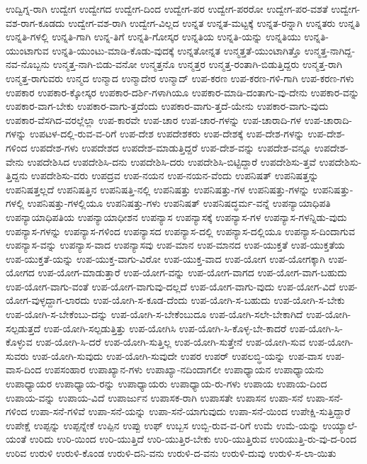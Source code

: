 {ಉದ್ವಿಗ್ನ-ರಾಗಿ
ಉದ್ವೇಗ
ಉದ್ವೇಗದ
ಉದ್ವೇಗ-ದಿಂದ
ಉದ್ವೇಗ-ಪರ
ಉದ್ವೇಗ-ಪರರೋ
ಉದ್ವೇಗ-ಪರ-ವಶತೆ
ಉದ್ವೇಗ-ವಶ-ರಾಗ-ಕೂಡದು
ಉದ್ವೇಗ-ವಶ-ರಾಗಿ
ಉದ್ವೇಗ-ವಿಲ್ಲದ
ಉನ್ನತ
ಉನ್ನತ-ಮಟ್ಟಕ್ಕೆ
ಉನ್ನತ-ರನ್ನಾಗಿ
ಉನ್ನತರು
ಉನ್ನತಿ
ಉನ್ನತಿ-ಗಳಲ್ಲಿ
ಉನ್ನತಿ-ಗಾಗಿ
ಉನ್ನ-ತಿಗೆ
ಉನ್ನತಿ-ಗೋಸ್ಕರ
ಉನ್ನತಿಯ
ಉನ್ನತಿ-ಯನ್ನು
ಉನ್ನತಿಯು
ಉನ್ನತಿ-ಯುಂಟಾಗುವ
ಉನ್ನತಿ-ಯುಂಟು-ಮಾಡಿ-ಕೊಡು-ವುದಕ್ಕೆ
ಉನ್ನತೋನ್ನತ
ಉನ್ಮತ್ತತೆ-ಯುಂಟಾಗಿತ್ತೊ
ಉನ್ಮತ್ತ-ನಾಗಿದ್ದ-ನವ-ನೊಬ್ಬನು
ಉನ್ಮತ್ತ-ನಾಗಿ-ಬಿಡು-ವನೋ
ಉನ್ಮತ್ತನೊ
ಉನ್ಮತ್ತರ
ಉನ್ಮತ್ತ-ರಂತಾಗಿ-ಬಿಡುತ್ತಿದ್ದರು
ಉನ್ಮತ್ತ-ರಾಗಿ
ಉನ್ಮತ್ತ-ರಾಗುವರು
ಉನ್ಮದ
ಉನ್ಮಾದ
ಉನ್ಮಾದೇರ
ಉನ್ಮಾದ್
ಉಪ-ಕರಣ
ಉಪ-ಕರಣ-ಗಳಿ-ಗಾಗಿ
ಉಪ-ಕರಣ-ಗಳು
ಉಪಕಾರ
ಉಪಕಾರ-ಕ್ಕೋಸ್ಕರ
ಉಪಕಾರ-ದರ್ಶಿ-ಗಳಾಗಿಯೂ
ಉಪಕಾರ-ಮಾಡಿ-ದಂತಾಗು-ವು-ದೇನು
ಉಪಕಾರ-ವನ್ನು
ಉಪಕಾರ-ವಾಗ-ಬೇಕು
ಉಪಕಾರ-ವಾಗು-ತ್ತದೆಂದು
ಉಪಕಾರ-ವಾಗು-ತ್ತದೆ-ಯೇನು
ಉಪಕಾರ-ವಾಗು-ವುದು
ಉಪಕಾರ-ವೆಸಗಿದ-ವರಲ್ಲೆಲ್ಲಾ
ಉಪ-ಕಾರವೇ
ಉಪ-ಚಾರ
ಉಪ-ಚಾರ-ಗಳನ್ನು
ಉಪ-ಚಾರಾದಿ-ಗಳ
ಉಪ-ಚಾರಾದಿ-ಗಳನ್ನು
ಉಪಟಳ-ದಲ್ಲಿ-ರುವ-ವ-ರಿಗೆ
ಉಪ-ದೇಶ
ಉಪದೇಶಕರು
ಉಪ-ದೇಶಕ್ಕೆ
ಉಪ-ದೇಶ-ಗಳನ್ನು
ಉಪ-ದೇಶ-ಗಳಿಂದ
ಉಪದೇಶ-ಗಳು
ಉಪದೇಶದ
ಉಪದೇಶ-ಮಾಡುತ್ತಿದ್ದರೆ
ಉಪ-ದೇಶ-ವನ್ನು
ಉಪದೇಶ-ವನ್ನೂ
ಉಪದೇಶ-ವೇನು
ಉಪದೇಶಿಸಿದ
ಉಪದೇಶಿಸಿ-ದನು
ಉಪದೇಶಿಸಿ-ದರು
ಉಪದೇಶಿಸಿ-ಬಿಟ್ಟಿದ್ದಾರೆ
ಉಪದೇಶಿಸು-ತ್ತವೆ
ಉಪದೇಶಿಸು-ತ್ತಿದ್ದನು
ಉಪದೇಶಿಸು-ವರು
ಉಪದ್ರವ
ಉಪ-ನಯನ
ಉಪ-ನಯನ-ವೆಂದು
ಉಪನಿಷತ್
ಉಪನಿಷತ್ತನ್ನು
ಉಪನಿಷತ್ತಲ್ಲದೆ
ಉಪನಿಷತ್ತಿನ
ಉಪನಿಷತ್ತಿ-ನಲ್ಲಿ
ಉಪನಿಷತ್ತು
ಉಪನಿಷತ್ತು-ಗಳ
ಉಪನಿಷತ್ತು-ಗಳನ್ನು
ಉಪನಿಷತ್ತು-ಗಳಲ್ಲಿ
ಉಪನಿಷತ್ತು-ಗಳಲ್ಲಿಯೂ
ಉಪನಿಷತ್ತು-ಗಳು
ಉಪನಿಷತ್
ಉಪನಿಷದ್ಧರ್ಮ-ವನ್ನೆ
ಉಪನ್ಯಾಯಾಧಿಪತಿ
ಉಪನ್ಯಾಯಾಧಿಪತಿಯ
ಉಪನ್ಯಾಯಾಧೀಶನ
ಉಪನ್ಯಾಸ
ಉಪನ್ಯಾಸಕ್ಕೆ
ಉಪನ್ಯಾಸ-ಗಳ
ಉಪನ್ಯಾಸ-ಗಳನ್ನಿಡು-ವುದು
ಉಪನ್ಯಾಸ-ಗಳನ್ನು
ಉಪನ್ಯಾಸ-ಗಳಿಂದ
ಉಪನ್ಯಾಸದ
ಉಪನ್ಯಾಸ-ದಲ್ಲಿ
ಉಪನ್ಯಾಸ-ದಲ್ಲಿಯೂ
ಉಪನ್ಯಾಸ-ದಿಂದಾಗುವ
ಉಪನ್ಯಾಸ-ವನ್ನು
ಉಪನ್ಯಾಸ-ವಾದ
ಉಪನ್ಯಾಸವು
ಉಪ-ಮಾನ
ಉಪ-ಮಾನದ
ಉಪ-ಯುಕ್ತತೆ
ಉಪ-ಯುಕ್ತತೆಯ
ಉಪ-ಯುಕ್ತತೆ-ಯನ್ನು
ಉಪ-ಯುಕ್ತ-ವಾಗು-ವಿರೋ
ಉಪ-ಯುಕ್ತ-ವಾದ
ಉಪ-ಯೋಗ
ಉಪ-ಯೋಗಕ್ಕಾಗಿ
ಉಪ-ಯೋಗದ
ಉಪ-ಯೋಗ-ಮಾಡುತ್ತಾರೆ
ಉಪ-ಯೋಗ-ವನ್ನು
ಉಪ-ಯೋಗ-ವಾಗದ
ಉಪ-ಯೋಗ-ವಾಗ-ಬಹುದು
ಉಪ-ಯೋಗ-ವಾಗು-ವಂತೆ
ಉಪ-ಯೋಗ-ವಾಗುವು-ದಲ್ಲದೆ
ಉಪ-ಯೋಗ-ವಾಗು-ವುದು
ಉಪ-ಯೋಗ-ವಿದೆ
ಉಪ-ಯೋಗ-ವುಳ್ಳದ್ದಾಗ-ಲಾರದು
ಉಪ-ಯೋಗಿ-ಸ-ಕೂಡ-ದೆಂದು
ಉಪ-ಯೋಗಿ-ಸ-ಬಹುದು
ಉಪ-ಯೋಗಿ-ಸ-ಬೇಕು
ಉಪ-ಯೋಗಿ-ಸ-ಬೇಕೆಂಬು-ದನ್ನು
ಉಪ-ಯೋಗಿ-ಸ-ಬೇಕೆಂಬುದೂ
ಉಪ-ಯೋಗಿ-ಸಲೇ-ಬೇಕಾಗಿದೆ
ಉಪ-ಯೋಗಿ-ಸಲ್ಪಡುತ್ತದೆ
ಉಪ-ಯೋಗಿ-ಸಲ್ಪಡುತ್ತಿತ್ತು
ಉಪ-ಯೋಗಿಸಿ
ಉಪ-ಯೋಗಿ-ಸಿ-ಕೊಳ್ಳ-ಬೇ-ಕಾದರೆ
ಉಪ-ಯೋಗಿ-ಸಿ-ಕೊಳ್ಳುವ
ಉಪ-ಯೋಗಿ-ಸಿ-ದರೆ
ಉಪ-ಯೋಗಿ-ಸುತ್ತಿಲ್ಲ
ಉಪ-ಯೋಗಿ-ಸುತ್ತೇನೆ
ಉಪ-ಯೋಗಿ-ಸುವ
ಉಪ-ಯೋಗಿ-ಸುವರು
ಉಪ-ಯೋಗಿ-ಸುವುದು
ಉಪ-ಯೋಗಿ-ಸುವುದೇ
ಉಪರ
ಉಪರ್
ಉಪಲಬ್ಧಿ-ಯನ್ನು
ಉಪ-ವಾಸ
ಉಪ-ವಾಸ-ದಿಂದ
ಉಪಸಂಹಾರ
ಉಪಾಖ್ಯಾನ-ಗಳು
ಉಪಾಖ್ಯಾ-ನದಿಂದಾಗಲೀ
ಉಪಾಧ್ಯಾಯನ
ಉಪಾಧ್ಯಾಯನು
ಉಪಾಧ್ಯಾಯರ
ಉಪಾಧ್ಯಾಯ-ರನ್ನು
ಉಪಾಧ್ಯಾಯರು
ಉಪಾಧ್ಯಾಯ-ರು-ಗಳು
ಉಪಾಯ
ಉಪಾಯ-ದಿಂದ
ಉಪಾಯ-ವನ್ನು
ಉಪಾಯ-ವಿದೆ
ಉಪಾರ್ಜುನ
ಉಪಾಸಕ-ರಾಗಿ
ಉಪಾಸತೇ
ಉಪಾಸನ
ಉಪಾ-ಸನೆ
ಉಪಾ-ಸನೆ-ಗಳಿಂದ
ಉಪಾ-ಸನೆ-ಗಳಿವೆ
ಉಪಾ-ಸನೆ-ಯನ್ನು
ಉಪಾ-ಸನೆ-ಯಾಗುವುದು
ಉಪಾ-ಸನೆ-ಯಿಂದ
ಉಪೇಕ್ಷಿ-ಸುತ್ತಿದ್ದಾರೆ
ಉಪೇಕ್ಷೆ
ಉಪ್ಪನ್ನು
ಉಪ್ಪನ್ನೇಕೆ
ಉಪ್ಪಿನ
ಉಪ್ಪು
ಉಫ್
ಉಬ್ಬಸ
ಉಬ್ಬಿ-ರುವ-ವ-ರಿಗೆ
ಉಮೆ
ಉಮೆ-ಯನ್ನು
ಉಯ್ಯಾಲೆ-ಯಂತೆ
ಉರಿದು
ಉರಿ-ಯಿಂದ
ಉರಿ-ಯುತ್ತಿದೆ
ಉರಿ-ಯುತ್ತಿರ-ಬೇಕು
ಉರಿ-ಯುತ್ತಿರುವ
ಉರಿಯುತ್ತಿ-ರು-ವು-ದ-ರಿಂದ
ಉರಿವ
ಉರುಳಿ
ಉರುಳಿ-ಕೊಂಡ
ಉರುಳಿ-ದನಿ-ವನು
ಉರುಳಿ-ದ-ವನು
ಉರುಳಿ-ದುವು
ಉರುಳಿ-ಸ-ಲಾ-ಯಿತು
}
